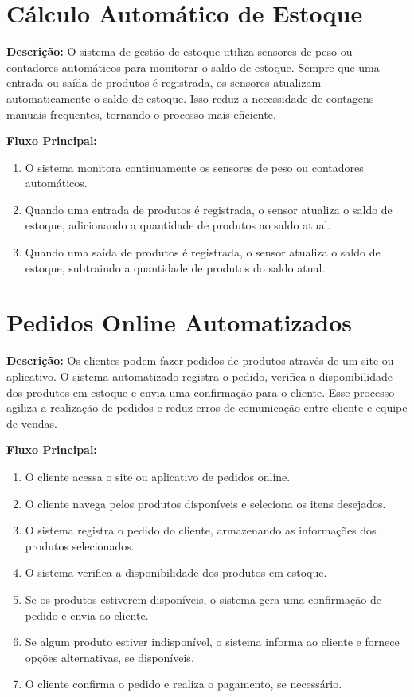 \documentclass[
	12pt,				%
	openright,			%
	twoside,			%
	a4paper,			%
	english,			%
	brazil				%
	]{abntex2}
\begin{document}
\section*{ Cálculo Automático de Estoque}

\textbf{Descrição:} O sistema de gestão de estoque utiliza sensores de peso ou contadores automáticos para monitorar o saldo de estoque. Sempre que uma entrada ou saída de produtos é registrada, os sensores atualizam automaticamente o saldo de estoque. Isso reduz a necessidade de contagens manuais frequentes, tornando o processo mais eficiente.

\textbf{Fluxo Principal:}
\begin{enumerate}
  \item O sistema monitora continuamente os sensores de peso ou contadores automáticos.
  \item Quando uma entrada de produtos é registrada, o sensor atualiza o saldo de estoque, adicionando a quantidade de produtos ao saldo atual.
  \item Quando uma saída de produtos é registrada, o sensor atualiza o saldo de estoque, subtraindo a quantidade de produtos do saldo atual.
\end{enumerate}


\section*{ Pedidos Online Automatizados}

\textbf{Descrição:} Os clientes podem fazer pedidos de produtos através de um site ou aplicativo. O sistema automatizado registra o pedido, verifica a disponibilidade dos produtos em estoque e envia uma confirmação para o cliente. Esse processo agiliza a realização de pedidos e reduz erros de comunicação entre cliente e equipe de vendas.

\textbf{Fluxo Principal:}
\begin{enumerate}
  \item O cliente acessa o site ou aplicativo de pedidos online.
  \item O cliente navega pelos produtos disponíveis e seleciona os itens desejados.
  \item O sistema registra o pedido do cliente, armazenando as informações dos produtos selecionados.
  \item O sistema verifica a disponibilidade dos produtos em estoque.
  \item Se os produtos estiverem disponíveis, o sistema gera uma confirmação de pedido e envia ao cliente.
  \item Se algum produto estiver indisponível, o sistema informa ao cliente e fornece opções alternativas, se disponíveis.
  \item O cliente confirma o pedido e realiza o pagamento, se necessário.
\end{enumerate}
\end{document}
